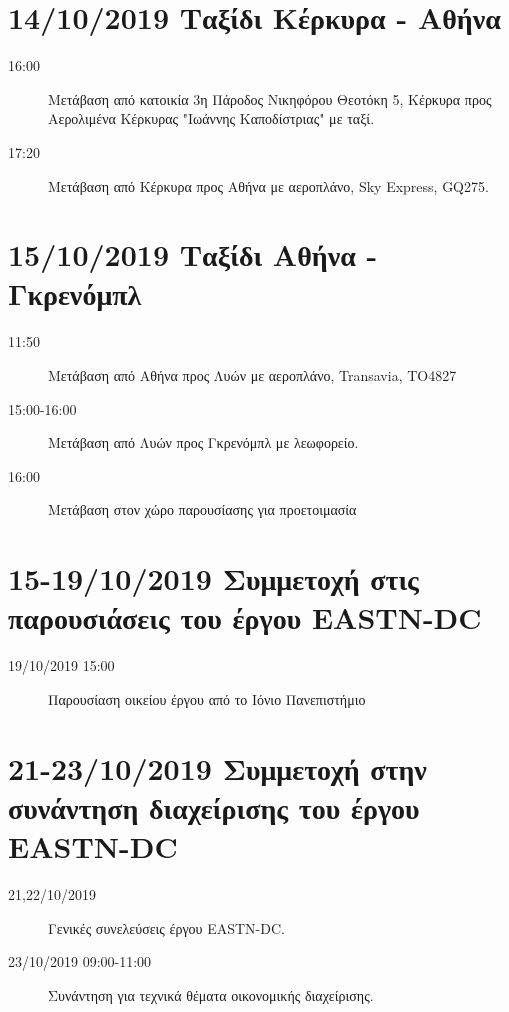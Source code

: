 \noindent
\maketitle

\section{14/10/2019 Ταξίδι Κέρκυρα - Αθήνα}
\label{sec:org58ebdb3}

\begin{description}
\item[{16:00}] Μετάβαση από κατοικία 3η Πάροδος Νικηφόρου Θεοτόκη 5, Κέρκυρα προς Αερολιμένα Κέρκυρας "Ιωάννης Καποδίστριας" με ταξί.
\item[{17:20}] Μετάβαση από Κέρκυρα προς Αθήνα με αεροπλάνο, Sky Express, GQ275.
\end{description}

\section{15/10/2019 Ταξίδι Αθήνα - Γκρενόμπλ}
\label{sec:org2c05471}

\begin{description}
\item[{11:50}] Μετάβαση από Αθήνα προς Λυών με αεροπλάνο, Transavia, ΤΟ4827
\item[{15:00-16:00}] Μετάβαση από Λυών προς Γκρενόμπλ με λεωφορείο.
\item[{16:00}] Μετάβαση στον χώρο παρουσίασης για προετοιμασία
\end{description}

\section{15-19/10/2019 Συμμετοχή στις παρουσιάσεις του έργου EASTN-DC}
\label{sec:org57bf81c}

\begin{description}
\item[{19/10/2019 15:00}] Παρουσίαση οικείου έργου από το Ιόνιο Πανεπιστήμιο
\end{description}

\section{21-23/10/2019 Συμμετοχή στην συνάντηση διαχείρισης του έργου EASTN-DC}
\label{sec:org4c386e4}

\begin{description}
\item[{21,22/10/2019}] Γενικές συνελεύσεις έργου EASTN-DC.
\item[{23/10/2019 09:00-11:00}] Συνάντηση για τεχνικά θέματα οικονομικής διαχείρισης.
\end{description}

